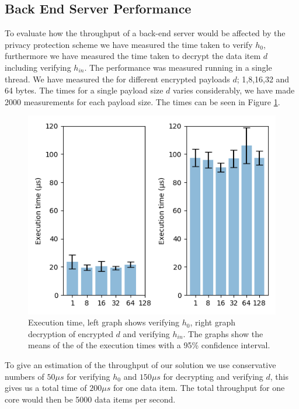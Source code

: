 {\subsection{Back End Server Performance}
To evaluate how the throughput of a back-end server would be affected by the privacy protection scheme we have measured the time taken to verify $h_0$, furthermore we have measured the time taken to decrypt the data item $d$ including verifying $h_{in}$. The performance was measured running in a single thread. We have measured the for different encrypted payloads $d$; 1,8,16,32 and 64 bytes. The times for a single payload size $d$ varies considerably, we have made 2000 measurements for each payload size. The times can be seen in Figure \ref{fig:java_performance}. 
\begin{figure}[H]
    \includegraphics[width=\linewidth]{papers/ppiot/images/java_bar_plot.png}
    \caption{Execution time, left graph shows verifying $h_0$, right graph decryption of encrypted $d$ and verifying $h_{in}$. The graphs show the means of the of the execution times with a 95\% confidence interval.}
    \label{fig:java_performance}
\end{figure}
To give an estimation of the throughput of our solution we use conservative numbers of $50\mu s$ for verifying $h_0$ and $150\mu s$ for decrypting and verifying $d$, this gives us a total time of $200\mu s$ for one data item. The total throughput for one core would then be 5000 data items per second.

}
